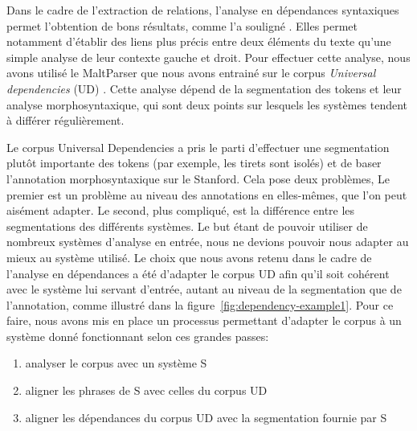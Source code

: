 \documentclass[PhD-Yoann-Dupont.tex]{subfiles}
\begin{document}
Dans le cadre de l'extraction de relations, l'analyse en dépendances syntaxiques permet l'obtention de bons résultats, comme l'a souligné \cite{bach2007review}. Elles permet notamment d'établir des liens plus précis entre deux éléments du texte qu'une simple analyse de leur contexte gauche et droit. Pour effectuer cette analyse, nous avons utilisé le MaltParser \citep{nivre2006maltparser} que nous avons entrainé sur le corpus \emph{Universal dependencies} (UD) \citep{nivre2016universal}. Cette analyse dépend de la segmentation des tokens et leur analyse morphosyntaxique, qui sont deux points sur lesquels les systèmes tendent à différer régulièrement.

Le corpus Universal Dependencies a pris le parti d'effectuer une segmentation plutôt importante des tokens (par exemple, les tirets sont isolés) et de baser l'annotation morphosyntaxique sur le Stanford. Cela pose deux problèmes, Le premier est un problème au niveau des annotations en elles-mêmes, que l'on peut aisément adapter. Le second, plus compliqué, est la différence entre les segmentations des différents systèmes. Le but étant de pouvoir utiliser de nombreux systèmes d'analyse en entrée, nous ne devions pouvoir nous adapter au mieux au système utilisé. Le choix que nous avons retenu dans le cadre de l'analyse en dépendances a été d'adapter le corpus UD afin qu'il soit cohérent avec le système lui servant d'entrée, autant au niveau de la segmentation que de l'annotation, comme illustré dans la figure\ \ref{fig:dependency-example1}. Pour ce faire, nous avons mis en place un processus permettant d'adapter le corpus à un système donné fonctionnant selon ces grandes passes:

\begin{enumerate}
    \item analyser le corpus avec un système S
    \item aligner les phrases de S avec celles du corpus UD
    \item aligner les dépendances du corpus UD avec la segmentation fournie par S
\end{enumerate}
\end{document}
